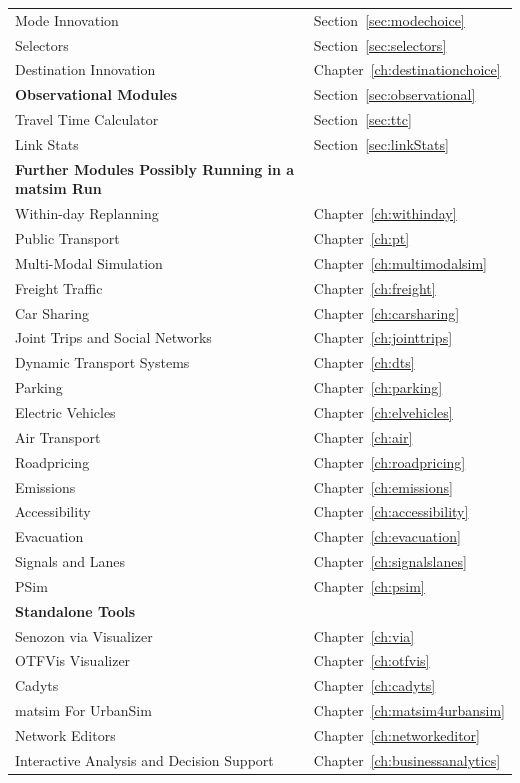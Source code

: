\begin{center}
\begin{longtable}{|l|l|}
	Mode Innovation & Section~\ref{sec:modechoice} \\
	Selectors & Section~\ref{sec:selectors} \\
	Destination Innovation & Chapter~\ref{ch:destinationchoice} \\
	\hline
	\textbf{Observational Modules} & Section~\ref{sec:observational} \\
	\hline
	Travel Time Calculator & Section~\ref{sec:ttc} \\
	Link Stats & Section~\ref{sec:linkStats} \\
	\hline
	\textbf{Further Modules Possibly Running in a \gls{matsim} Run} & \\
	\hline
	Within-day Replanning & Chapter~\ref{ch:withinday} \\
	Public Transport & Chapter~\ref{ch:pt} \\
	Multi-Modal Simulation & Chapter~\ref{ch:multimodalsim} \\
	Freight Traffic & Chapter~\ref{ch:freight} \\
	Car Sharing & Chapter~\ref{ch:carsharing} \\
	Joint Trips and Social Networks & Chapter~\ref{ch:jointtrips} \\
	Dynamic Transport Systems & Chapter~\ref{ch:dts} \\
	Parking & Chapter~\ref{ch:parking} \\
	Electric Vehicles & Chapter~\ref{ch:elvehicles} \\
	Air Transport & Chapter~\ref{ch:air} \\
	Roadpricing & Chapter~\ref{ch:roadpricing} \\
	Emissions & Chapter~\ref{ch:emissions} \\
	Accessibility & Chapter~\ref{ch:accessibility} \\
	Evacuation & Chapter~\ref{ch:evacuation}  \\
	Signals and Lanes & Chapter~\ref{ch:signalslanes} \\
	PSim & Chapter~\ref{ch:psim} \\
	\hline
	\textbf{Standalone Tools} & \\ %
	\hline
	Senozon via Visualizer & Chapter~\ref{ch:via} \\
	OTFVis Visualizer & Chapter~\ref{ch:otfvis} \\
	Cadyts & Chapter~\ref{ch:cadyts} \\
	\gls{matsim} For UrbanSim & Chapter~\ref{ch:matsim4urbansim} \\	
	Network Editors &  Chapter~\ref{ch:networkeditor} \\
	Interactive Analysis and Decision Support & Chapter~\ref{ch:businessanalytics} \\
\end{longtable}
\end{center}

